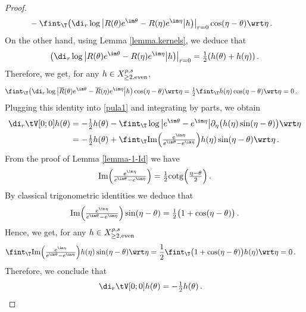 \documentclass[a4paper,reqno,10pt]{article}
\newcommand{\pa}{\partial}
\begin{document}
\begin{proof}
\begin{equation}
\begin{aligned}
				& - \fint_{\T} \big(\di_{r}\log\big| R(\theta) e^{\im\theta}-  R(\eta)e^{\im\eta} \big| h\big)\big|_{ r=0}  \cos(\eta-\theta)  \wrt\eta \,.
			\end{aligned}
		\end{equation}
        On the other hand, using Lemma \ref{lemma.kernels}, we deduce that
        \begin{align}\label{log-1}
\big(\di_{r}\log\big| R(\theta) e^{\im\theta}- R(\eta)e^{\im\eta} \big| h \big) \big|_{ r=0}=\tfrac12(h(\theta)+h(\eta)) \,.
            \end{align}
            Therefore, we get, for any $h\in X_{\geq 2,\rm even}^{\rho,s}$,
        \begin{align*}
 \fint_{\T} \big(\di_{r}\log\big|\overline R(\theta) e^{\im\theta}- \overline R(\eta)e^{\im\eta} \big| h\big)  \cos(\eta-\theta)  \wrt\eta&= \tfrac12\fint_{\T} h(\eta) \cos(\eta-\theta)  \wrt\eta=0 \,.
            \end{align*}
           Plugging this identity into \eqref{pula1} and  integrating  by parts, we obtain
            \begin{align*}
			\di_{r}\tV[0;0]h(\theta) &= -\tfrac12 h(\theta)-  \fint_{\T} \log\big| e^{\im\theta}- e^{\im\eta} \big| \pa_{\eta} \big( h(\eta) \sin(\eta-\theta) \big) \wrt\eta\\
           &= - \tfrac12 h(\theta)+ \fint_{\T} {\rm Im}\Big(\tfrac{e^{\im \eta}}{ e^{\im\theta}- e^{\im\eta}} \Big)  h(\eta) \sin(\eta-\theta)  \wrt\eta \,.
		\end{align*}
     From the proof of Lemma \ref{lemma-1-Id} we have
    $$
    {\rm Im}\Big(\tfrac{e^{\im \eta}}{ e^{\im\theta}- e^{\im\eta}} \Big) =\tfrac12{\rm cotg}\Big(\tfrac{\eta-\theta}{2}\Big) \,.$$
    By classical trigonometric identities we deduce that
    \begin{align}
{\rm Im}\Big(\tfrac{e^{\im \eta}}{ e^{\im\theta}- e^{\im\eta}} \Big)\sin(\eta-\theta) =\tfrac12 \big(1+\cos(\eta-\theta)\big) \,.
    \end{align}
    Hence, we get, for any $h\in X_{\geq 2,\rm even}^{\rho,s}$
    \begin{align*}
		 \fint_{\T} {\rm Im}\Big(\tfrac{e^{\im \eta}}{ e^{\im\theta}- e^{\im\eta}} \Big)  h(\eta) \sin(\eta-\theta)  \wrt\eta&=\frac{1}{2  } \fint_{\T}\big(1+\cos(\eta-\theta)\big)  h(\eta)  \wrt\eta =0 \,.
		\end{align*}
        Therefore, we conclude that
        \begin{align*}
			\di_{r}\tV[0;0]h(\theta) &= - \tfrac12 h(\theta) \,.

\end{align*}
\end{proof}
\end{document}
